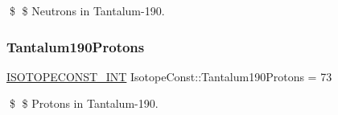 \$ \$ Neutrons in Tantalum-\/190. \mbox{\label{group___isotope_const-_tantalum-_ta190_gac16acd7e86cae8ed29c3229ba3a5f182}} 
\subsubsection{\texorpdfstring{Tantalum190\+Protons}{Tantalum190Protons}}
{\footnotesize\ttfamily \mbox{\hyperlink{group___isotope_const-_macros_ga5f18360b3e99483a35c32d789e62621c}{I\+S\+O\+T\+O\+P\+E\+C\+O\+N\+S\+T\+\_\+\+I\+NT}} Isotope\+Const\+::\+Tantalum190\+Protons = 73}

\$ \$ Protons in Tantalum-\/190. 